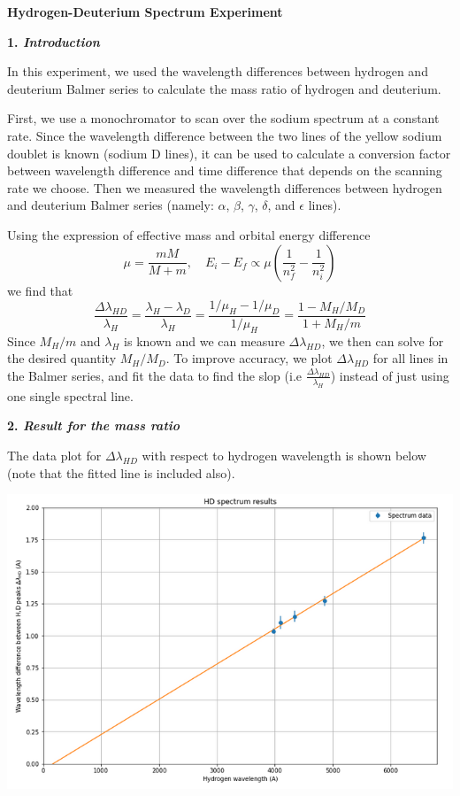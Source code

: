 \documentclass[12pt]{article}
\begin{document}
\textbf{Hydrogen-Deuterium Spectrum Experiment}
\bigskip

\textbf{1. \textit{Introduction}}
\smallskip


In this experiment, we used the wavelength differences between hydrogen and deuterium Balmer series to calculate the mass ratio of hydrogen and deuterium.

First, we use a monochromator to scan over the sodium spectrum at a constant rate. Since the wavelength difference between the two lines of the yellow sodium doublet is known (sodium D lines), it can be used to calculate a conversion factor between wavelength difference and time difference that depends on the scanning rate we choose. Then we measured the wavelength differences between hydrogen and deuterium Balmer series (namely: $\alpha$, $\beta$, $\gamma$, $\delta$, and $\epsilon$ lines).

Using the expression of effective mass and orbital energy difference
$$\mu = \frac{mM}{M+m}, \quad E_i -E_f \propto \mu (\frac{1}{n_f^2} - \frac{1}{n_i^2}) $$
we find that 
$$\frac{\Delta \lambda_{HD}}{\lambda_H} =  \frac{\lambda_H - \lambda_D}{\lambda_H}= \frac{1/ \mu_H - 1/ \mu_D}{1/\mu_H} = \frac{1- M_H / M_D}{1+M_H/m}$$
Since $M_H/m$ and $\lambda_H$ is known and we can measure $\Delta \lambda_{HD}$, we then can solve for the desired quantity $M_H/M_D$. To improve accuracy, we plot $\Delta \lambda_{HD}$ for all lines in the Balmer series, and fit the data to find the slop (i.e  $\frac{\Delta \lambda_{HD}}{\lambda_H}$) instead of just using one single spectral line.
\bigskip

\textbf{2. \textit{Result for the mass ratio}}
\smallskip

The data plot for $\Delta \lambda_{HD}$ with respect to hydrogen wavelength is shown below (note that the fitted line is included also). 
\smallskip

\begin{center}
\includegraphics[width=16cm]{wavelength_difference}
\end{center}
\smallskip
\end{document}
